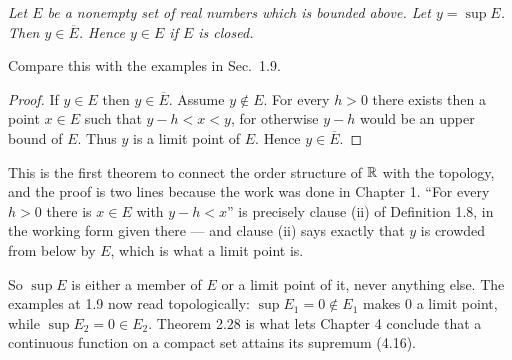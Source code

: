 \begin{center}
\end{center}

\emph{Let $E$ be a nonempty set of real numbers which is bounded above. Let
$y = \sup E$. Then $y \in \overline{E}$. Hence $y \in E$ if $E$ is closed.}

Compare this with the examples in Sec.\ 1.9.

\begin{proof}
If $y \in E$ then $y \in \overline{E}$. Assume $y \notin E$. For every $h > 0$
there exists then a point $x \in E$ such that $y - h < x < y$, for otherwise
$y - h$ would be an upper bound of $E$. Thus $y$ is a limit point of $E$. Hence
$y \in \overline{E}$.
\end{proof}

\begin{unpack}
This is the first theorem to connect the order structure of $\mathbb{R}$ with the
topology, and the proof is two lines because the work was done in Chapter 1.
``For every $h>0$ there is $x \in E$ with $y - h < x$'' is precisely clause
(ii) of Definition 1.8, in the working form given there --- and clause (ii)
says exactly that $y$ is crowded from below by $E$, which is what a limit point
is.

So $\sup E$ is either a member of $E$ or a limit point of it, never anything
else. The examples at 1.9 now read topologically: $\sup E_1 = 0 \notin E_1$
makes $0$ a limit point, while $\sup E_2 = 0 \in E_2$. Theorem 2.28 is what
lets Chapter 4 conclude that a continuous function on a compact set attains its
supremum (4.16).
\end{unpack}

